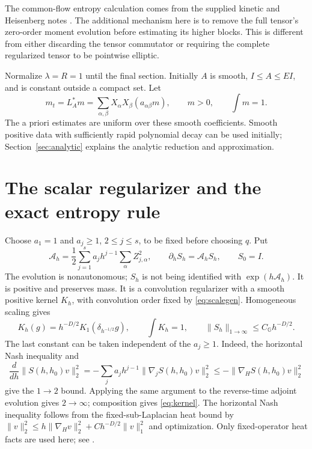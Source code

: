 \documentclass[11pt,a4paper]{amsart}
\numberwithin{equation}{section}
\theoremstyle{remark}\newtheorem{remark}[theorem]{Remark}
\newcommand{\G}{\mathbb G}
\newcommand{\cA}{\mathcal A}
\newcommand{\norm}[1]{\lVert #1\rVert}
\begin{document}
The common-flow entropy calculation comes from the supplied kinetic and
Heisenberg notes \cite{Kinetic,Heisenberg}. The additional mechanism here is to
remove the full tensor's zero-order moment evolution before estimating its
higher blocks. This is different from either discarding the tensor commutator
or requiring the complete regularized tensor to be pointwise elliptic.

Normalize $\lambda=R=1$ until the final section. Initially $A$ is smooth,
$I\le A\le EI$, and is constant outside a compact set. Let
\begin{equation}\label{eq:physical}
 m_t=L_A^*m=\sum_{\alpha,\beta}X_\alpha X_\beta(a_{\alpha\beta}m),
 \qquad m>0,\qquad\int m=1.
\end{equation}
The a priori estimates are uniform over these smooth coefficients. Smooth
positive data with sufficiently rapid polynomial decay can be used initially;
Section~\ref{sec:analytic} explains the analytic reduction and approximation.

\section{The scalar regularizer and the exact entropy rule}
Choose $a_1=1$ and $a_j\ge1$, $2\le j\le s$, to be fixed before choosing $q$.
Put
\begin{equation}\label{eq:scalegen}
 \cA_h=\frac12\sum_{j=1}^s a_jh^{j-1}\sum_\alpha Z_{j,\alpha}^2,
 \qquad \partial_h S_h=\cA_hS_h,\qquad S_0=I.
\end{equation}
The evolution is nonautonomous; $S_h$ is not being identified with
$\exp(h\cA_h)$. It is positive and preserves mass. It is a convolution
regularizer with a smooth positive kernel $K_h$, with convolution order fixed
by \eqref{eq:scalegen}. Homogeneous scaling gives
\begin{equation}\label{eq:kernel}
 K_h(g)=h^{-D/2}K_1(\delta_{h^{-1/2}}g),\qquad \int K_h=1,
 \qquad\norm{S_h}_{1\to\infty}\le C_\G h^{-D/2}.
\end{equation}
The last constant can be taken independent of the $a_j\ge1$. Indeed, the
horizontal Nash inequality and
\[
 \frac d{dh}\norm{S(h,h_0)v}_2^2
 =-\sum_j a_jh^{j-1}\norm{\nabla_jS(h,h_0)v}_2^2
 \le-\norm{\nabla_HS(h,h_0)v}_2^2
\]
give the $1\to2$ bound. Applying the same argument to the reverse-time adjoint
evolution gives $2\to\infty$; composition gives \eqref{eq:kernel}. The
horizontal Nash inequality follows from the fixed-sub-Laplacian heat bound by
$\norm{v}_2^2\le h\norm{\nabla_Hv}_2^2+C h^{-D/2}\norm{v}_1^2$ and
optimization. Only fixed-operator heat facts are used here; see \cite{GTHeat}.
\end{document}
